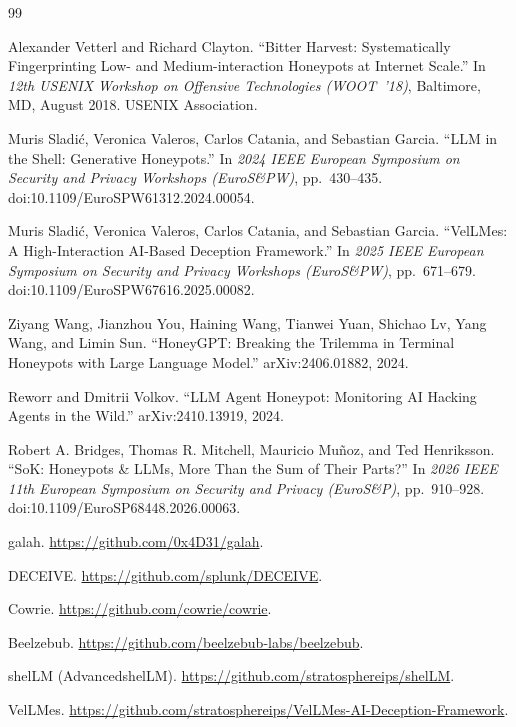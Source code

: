 \documentclass[a4paper,11pt]{article}
\begin{document}
\begin{thebibliography}{99}

Alexander Vetterl and Richard Clayton. ``Bitter Harvest: Systematically
Fingerprinting Low- and Medium-interaction Honeypots at Internet Scale.'' In
\emph{12th USENIX Workshop on Offensive Technologies (WOOT~'18)}, Baltimore,
MD, August 2018. USENIX Association.

Muris Sladi\'c, Veronica Valeros, Carlos Catania, and Sebastian Garcia. ``LLM in
the Shell: Generative Honeypots.'' In \emph{2024 IEEE European Symposium on
Security and Privacy Workshops (EuroS\&PW)}, pp.~430--435.
doi:10.1109/EuroSPW61312.2024.00054.

Muris Sladi\'c, Veronica Valeros, Carlos Catania, and Sebastian Garcia.
``VelLMes: A High-Interaction AI-Based Deception Framework.'' In \emph{2025
IEEE European Symposium on Security and Privacy Workshops (EuroS\&PW)}, pp.~671--679.
doi:10.1109/EuroSPW67616.2025.00082.

Ziyang Wang, Jianzhou You, Haining Wang, Tianwei Yuan, Shichao Lv, Yang Wang,
and Limin Sun. ``HoneyGPT: Breaking the Trilemma in Terminal Honeypots with
Large Language Model.'' arXiv:2406.01882, 2024.

Reworr and Dmitrii Volkov. ``LLM Agent Honeypot: Monitoring AI Hacking Agents in
the Wild.'' arXiv:2410.13919, 2024.

Robert A. Bridges, Thomas R. Mitchell, Mauricio Mu\~noz, and Ted Henriksson.
``SoK: Honeypots \& LLMs, More Than the Sum of Their Parts?'' In \emph{2026 IEEE
11th European Symposium on Security and Privacy (EuroS\&P)}, pp.~910--928.
doi:10.1109/EuroSP68448.2026.00063.

galah. \url{https://github.com/0x4D31/galah}.

DECEIVE. \url{https://github.com/splunk/DECEIVE}.

Cowrie. \url{https://github.com/cowrie/cowrie}.

Beelzebub. \url{https://github.com/beelzebub-labs/beelzebub}.

shelLM (AdvancedshelLM). \url{https://github.com/stratosphereips/shelLM}.

VelLMes. \url{https://github.com/stratosphereips/VelLMes-AI-Deception-Framework}.

\end{thebibliography}
\end{document}
